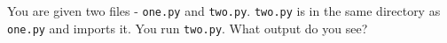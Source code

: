 \question
You are given two files - \texttt{one.py} and \texttt{two.py}. \texttt{two.py} is in the same directory as \texttt{one.py} and imports it. You run \texttt{two.py}. What output do you see?
\emptybox[0.95\textwidth]{8cm}
